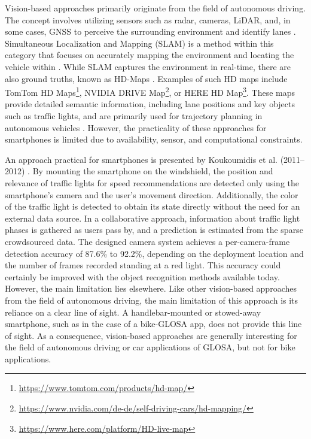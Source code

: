Vision-based approaches primarily originate from the field of autonomous driving. The concept involves utilizing sensors such as radar, cameras, LiDAR, and, in some cases, GNSS to perceive the surrounding environment and identify lanes \cite{lee_avm_2017} \cite{sadli_map-matching-based_2022}. Simultaneous Localization and Mapping (SLAM) is a method within this category that focuses on accurately mapping the environment and locating the vehicle within \cite{cheng_review_2022}. While SLAM captures the environment in real-time, there are also ground truths, known as HD-Maps \cite{kang_lane-level_2020}. Examples of such HD maps include TomTom HD Maps\footnote{\url{https://www.tomtom.com/products/hd-map/}}, NVIDIA DRIVE Map\footnote{\url{https://www.nvidia.com/de-de/self-driving-cars/hd-mapping/}}, or HERE HD Map\footnote{\url{https://www.here.com/platform/HD-live-map}}. These maps provide detailed semantic information, including lane positions and key objects such as traffic lights, and are primarily used for trajectory planning in autonomous vehicles \cite{yang_hdnet_2018}. However, the practicality of these approaches for smartphones is limited due to availability, sensor, and computational constraints.

An approach practical for smartphones is presented by Koukoumidis et al. (2011–2012) \cite{koukoumidis_signalguru_2011, koukoumidis_leveraging_2012}. By mounting the smartphone on the windshield, the position and relevance of traffic lights for speed recommendations are detected only using the smartphone's camera and the user's movement direction. Additionally, the color of the traffic light is detected to obtain its state directly without the need for an external data source. In a collaborative approach, information about traffic light phases is gathered as users pass by, and a prediction is estimated from the sparse crowdsourced data. The designed camera system achieves a per-camera-frame detection accuracy of 87.6\% to 92.2\%, depending on the deployment location and the number of frames recorded standing at a red light. This accuracy could certainly be improved with the object recognition methods available today. However, the main limitation lies elsewhere. Like other vision-based approaches from the field of autonomous driving, the main limitation of this approach is its reliance on a clear line of sight. A handlebar-mounted or stowed-away smartphone, such as in the case of a bike-GLOSA app, does not provide this line of sight. As a consequence, vision-based approaches are generally interesting for the field of autonomous driving or car applications of GLOSA, but not for bike applications.

